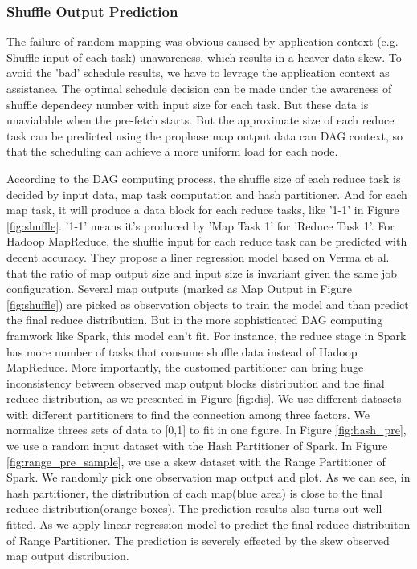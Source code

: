 \documentclass[10pt,twocolumn]{article}
\begin{document}
\subsubsection{Shuffle Output Prediction}
The failure of random mapping was obvious caused by application context (e.g. Shuffle input of each task) unawareness, which results in a heaver data skew. To avoid the 'bad' schedule results, we have to levrage the application context as assistance. The optimal schedule decision can be made under the awareness of shuffle dependecy number with input size for each task. But these data is unavialable when the pre-fetch starts. But the approximate size of each reduce task can be predicted using the prophase map output data can DAG context, so that the scheduling can achieve a more uniform load for each node.

According to the DAG computing process, the shuffle size of each reduce task is decided by input data, map task computation and hash partitioner. And for each map task, it will produce a data block for each reduce tasks, like '1-1' in Figure \ref{fig:shuffle}. '1-1' means it's produced by 'Map Task 1' for 'Reduce Task 1'. For Hadoop MapReduce, the shuffle input for each reduce task can be predicted with decent accuracy\cite{ishuffle}. They propose a liner regression model based on Verma et al.\cite{predict} that the ratio of map output size and input size is invariant given the same job configuration. Several map outputs (marked as Map Output in Figure \ref{fig:shuffle}) are picked as observation objects to train the model and than predict the final reduce distribution. But in the more sophisticated DAG computing framwork like Spark, this model can't fit. For instance, the reduce stage in Spark has more number of tasks that consume shuffle data instead of Hadoop MapReduce. More importantly, the customed partitioner can bring huge inconsistency between observed map output blocks distribution and the final reduce distribution, as we presented in Figure \ref{fig:dis}. We use different datasets with different partitioners to find the connection among three factors. We normalize threes sets of data to [0,1] to fit in one figure. In Figure \ref{fig:hash_pre}, we use a random input dataset with the Hash Partitioner of Spark\cite{sparksource}. In Figure \ref{fig:range_pre_sample}, we use a skew dataset with the Range Partitioner of Spark\cite{sparksource}.
We randomly pick one observation map output and plot. As we can see, in hash partitioner, the distribution of each map(blue area) is close to the final reduce distribution(orange boxes). The prediction results also turns out well fitted. As we apply linear regression model to predict the final reduce distribuiton of Range Partitioner. The prediction is severely effected by the skew observed map output distribution. 
\end{document}
